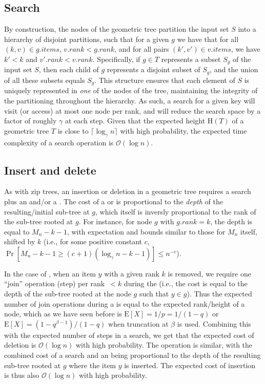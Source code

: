 \documentclass{article}
\begin{document}
\subsection{Search}

By construction, the nodes of the geometric tree partition the input set $S$ into a hierarchy of disjoint partitions, such that for a given $g$ we have that for all $(k, v) \in g.items$, $v.rank < g.rank$, and for all pairs $(k', v') \in v.items$, we have $k' < k$ and $v'.rank < v.rank$. Specifically, if $g \in T$ represents a subset $S_g$ of the input set $S$, then each child of $g$ represents a disjoint subset of $S_g$, and the union of all these subsets equals $S_g$. This structure ensures that each element of $S$ is uniquely represented in \emph{one} of the nodes of the tree, maintaining the integrity of the partitioning throughout the hierarchy. As such, a search for a given key will visit (or access) at most one node per rank, and will reduce the search space by a factor of roughly $\gamma$ at each step. Given that the expected height $\text{H}(T)$ of a geometric tree $T$ is close to $\lceil\log_\gamma n\rceil$ with high probability, the expected time complexity of a search operation is $\mathcal{O}(\log n)$.

\subsection{Insert and delete}

As with zip trees, an insertion or deletion in a geometric tree requires a search plus an \unzip and/or a \zip. The cost of a \zip or \unzip is proportional to the \emph{depth} of the resulting/initial sub-tree at $g$, which itself is inversly proportional to the rank of the sub-tree rooted at $g$. For instance, for node $g$ with $g.rank = k$, the depth is equal to $M_n - k - 1$, with expectation and bounds similar to those for $M_n$ itself, shifted by $k$ (i.e., for some positive constant $c$, $\Pr[M_n - k - 1 \ge (c + 1) (\log_\gamma n - k - 1)] \le n^{-c}$).

In the case of \delete, when an item $y$ with a given rank $k$ is removed, we require one ``join'' operation (step) per rank~$< k$ during the \zip (i.e., the cost is equal to the depth of the sub-tree rooted at the node $g$ such that $y \in g$). Thus the expected number of join operations during a \delete is equal to the expected rank/height of a node, which as we have seen before is $\text{E}[X] = 1/p = 1/(1 - q)$ or $\text{E}[X] = (1 - q^{\beta-1})/(1 - q)$ when truncation at $\beta$ is used. Combining this with the expected number of steps in a search, we get that the expected cost of deletion is $\mathcal{O}(\log n)$ with high probability. The \insert operation is similar, with the combined cost of a search and an \unzip being proportional to the depth of the resulting sub-tree rooted at $g$ where the item $y$ is inserted. The expected cost of insertion is thus also $\mathcal{O}(\log n)$ with high probability.
\end{document}
